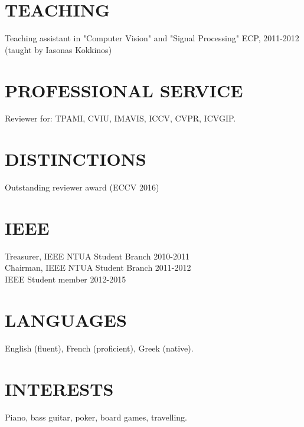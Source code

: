 \documentclass[margin]{res}
\begin{document}
\begin{resume}
\section{TEACHING} Teaching assistant in "Computer Vision" and "Signal Processing" \hfill ECP, 2011-2012 \\(taught by Iasonas Kokkinos)  	
\section{PROFESSIONAL SERVICE} Reviewer for: TPAMI, CVIU, IMAVIS, ICCV, CVPR, ICVGIP. 
\newline

\section{DISTINCTIONS} Outstanding reviewer award (ECCV 2016)

\section{IEEE}
		Treasurer, IEEE NTUA Student Branch \hfill 2010-2011 \\
	    Chairman, IEEE NTUA Student Branch \hfill 2011-2012 \\
	    IEEE Student member	\hfill 2012-2015
 
 \section{LANGUAGES} English (fluent), French (proficient), Greek (native).
 \section{INTERESTS} Piano, bass guitar, poker, board games, travelling.
 
 
\end{resume}
\end{document}

